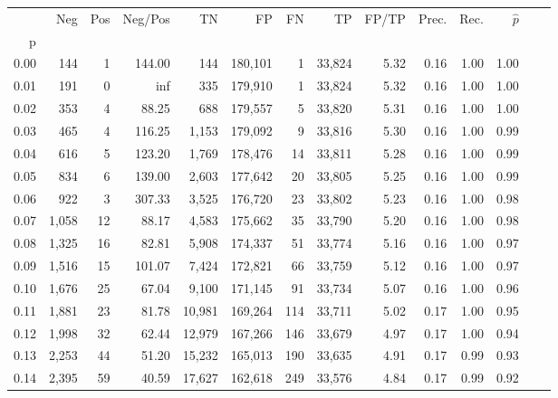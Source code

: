 \begin{tabular}{rrrrrrrrrrrrrr}
\toprule
{} &    Neg &  Pos & Neg/Pos &       TN &       FP &      FN &      TP & FP/TP & Prec. &  Rec. & $\hat{p}$ \\
p    &        &      &         &          &          &         &         &       &       &       &           \\
\midrule
0.00 &    144 &    1 &  144.00 &      144 &  180,101 &       1 &  33,824 &  5.32 &  0.16 &  1.00 &      1.00 \\
0.01 &    191 &    0 &     inf &      335 &  179,910 &       1 &  33,824 &  5.32 &  0.16 &  1.00 &      1.00 \\
0.02 &    353 &    4 &   88.25 &      688 &  179,557 &       5 &  33,820 &  5.31 &  0.16 &  1.00 &      1.00 \\
0.03 &    465 &    4 &  116.25 &    1,153 &  179,092 &       9 &  33,816 &  5.30 &  0.16 &  1.00 &      0.99 \\
0.04 &    616 &    5 &  123.20 &    1,769 &  178,476 &      14 &  33,811 &  5.28 &  0.16 &  1.00 &      0.99 \\
0.05 &    834 &    6 &  139.00 &    2,603 &  177,642 &      20 &  33,805 &  5.25 &  0.16 &  1.00 &      0.99 \\
0.06 &    922 &    3 &  307.33 &    3,525 &  176,720 &      23 &  33,802 &  5.23 &  0.16 &  1.00 &      0.98 \\
0.07 &  1,058 &   12 &   88.17 &    4,583 &  175,662 &      35 &  33,790 &  5.20 &  0.16 &  1.00 &      0.98 \\
0.08 &  1,325 &   16 &   82.81 &    5,908 &  174,337 &      51 &  33,774 &  5.16 &  0.16 &  1.00 &      0.97 \\
0.09 &  1,516 &   15 &  101.07 &    7,424 &  172,821 &      66 &  33,759 &  5.12 &  0.16 &  1.00 &      0.97 \\
0.10 &  1,676 &   25 &   67.04 &    9,100 &  171,145 &      91 &  33,734 &  5.07 &  0.16 &  1.00 &      0.96 \\
0.11 &  1,881 &   23 &   81.78 &   10,981 &  169,264 &     114 &  33,711 &  5.02 &  0.17 &  1.00 &      0.95 \\
0.12 &  1,998 &   32 &   62.44 &   12,979 &  167,266 &     146 &  33,679 &  4.97 &  0.17 &  1.00 &      0.94 \\
0.13 &  2,253 &   44 &   51.20 &   15,232 &  165,013 &     190 &  33,635 &  4.91 &  0.17 &  0.99 &      0.93 \\
0.14 &  2,395 &   59 &   40.59 &   17,627 &  162,618 &     249 &  33,576 &  4.84 &  0.17 &  0.99 &      0.92 \\

\end{tabular}
